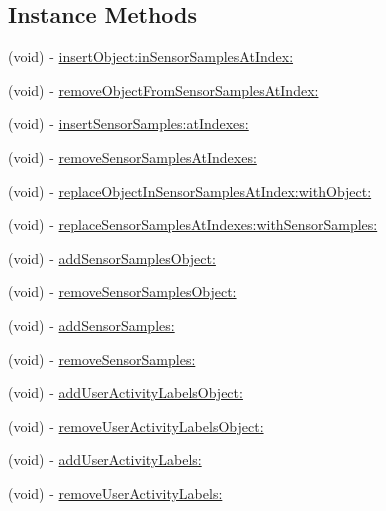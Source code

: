 \subsection*{Instance Methods}
\begin{DoxyCompactItemize}
\item 
(void) -\/ \hyperlink{interface_e_s___activity_a4766cc019c128bf95fdd45244757ff31}{insert\+Object\+:in\+Sensor\+Samples\+At\+Index\+:}
\item 
(void) -\/ \hyperlink{interface_e_s___activity_a565963029b66ca8274ce9c3fb4fec6da}{remove\+Object\+From\+Sensor\+Samples\+At\+Index\+:}
\item 
(void) -\/ \hyperlink{interface_e_s___activity_af8a4906c606dcb733db9e00293d2c38d}{insert\+Sensor\+Samples\+:at\+Indexes\+:}
\item 
(void) -\/ \hyperlink{interface_e_s___activity_a4c2271af8fc94b9b3fc5227500c48627}{remove\+Sensor\+Samples\+At\+Indexes\+:}
\item 
(void) -\/ \hyperlink{interface_e_s___activity_a70053334ab83b38f8afb6c7ebdf92c54}{replace\+Object\+In\+Sensor\+Samples\+At\+Index\+:with\+Object\+:}
\item 
(void) -\/ \hyperlink{interface_e_s___activity_a8bffc9fbc9ff0b33b38b188cedbd4fbe}{replace\+Sensor\+Samples\+At\+Indexes\+:with\+Sensor\+Samples\+:}
\item 
(void) -\/ \hyperlink{interface_e_s___activity_ab0c48dd846438c6c4f0e095b200711c5}{add\+Sensor\+Samples\+Object\+:}
\item 
(void) -\/ \hyperlink{interface_e_s___activity_ab964a0a4c3a0862bad80233b59fe7328}{remove\+Sensor\+Samples\+Object\+:}
\item 
(void) -\/ \hyperlink{interface_e_s___activity_a915ee63f7c88caf27fad6041c21923fd}{add\+Sensor\+Samples\+:}
\item 
(void) -\/ \hyperlink{interface_e_s___activity_a3fa29a77b364efbefc881197da5e4127}{remove\+Sensor\+Samples\+:}
\item 
(void) -\/ \hyperlink{interface_e_s___activity_a98e8184d80b2da8c43f789c20074b9c1}{add\+User\+Activity\+Labels\+Object\+:}
\item 
(void) -\/ \hyperlink{interface_e_s___activity_a3341590aa3005b61e997c5a50452ad92}{remove\+User\+Activity\+Labels\+Object\+:}
\item 
(void) -\/ \hyperlink{interface_e_s___activity_a29e5155c46c50ec3b4a73f65dab5a999}{add\+User\+Activity\+Labels\+:}
\item 
(void) -\/ \hyperlink{interface_e_s___activity_a23eb329e1dfb91ac1247dba3ec40e8ee}{remove\+User\+Activity\+Labels\+:}
\end{DoxyCompactItemize}
